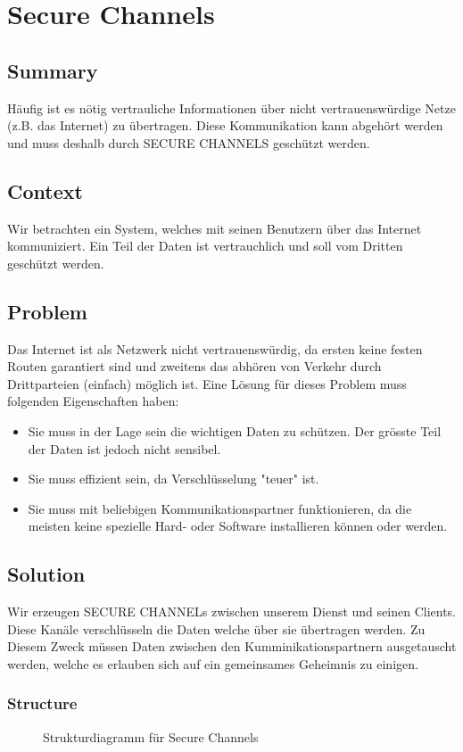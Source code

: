 \chapter{Secure Channels}

\section{Summary}
Häufig ist es nötig vertrauliche Informationen über nicht vertrauenswürdige Netze (z.B. das Internet) zu übertragen. Diese Kommunikation kann abgehört werden und muss deshalb durch SECURE CHANNELS geschützt werden.

\section{Context}
Wir betrachten ein System, welches mit seinen Benutzern über das Internet kommuniziert. Ein Teil der Daten ist vertrauchlich und soll vom Dritten geschützt werden.

\section{Problem}
Das Internet ist als Netzwerk nicht vertrauenswürdig, da ersten keine festen Routen garantiert sind und zweitens das abhören von Verkehr durch Drittparteien (einfach) möglich ist. Eine Lösung für dieses Problem muss folgenden Eigenschaften haben:
\begin{itemize}
  \item Sie muss in der Lage sein die wichtigen Daten zu schützen. Der grösste Teil der Daten ist jedoch nicht sensibel.
  \item Sie muss effizient sein, da Verschlüsselung "teuer" ist.
  \item Sie muss mit beliebigen Kommunikationspartner funktionieren, da die meisten keine spezielle Hard- oder Software installieren können oder werden.
\end{itemize}

\section{Solution}
Wir erzeugen SECURE CHANNELs zwischen unserem Dienst und seinen Clients. Diese Kanäle verschlüsseln die Daten welche über sie übertragen werden. Zu Diesem Zweck müssen Daten zwischen den Kumminikationspartnern ausgetauscht werden, welche es erlauben sich auf ein gemeinsames Geheimnis zu einigen.
\subsection{Structure}
\begin{figure}[H]
  \centering
  
  \caption{Strukturdiagramm f\"ur Secure Channels}
\end{figure}

